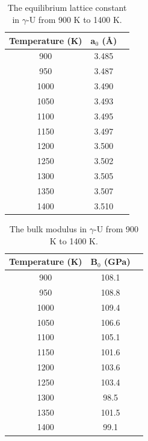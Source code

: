 \documentclass[review]{elsarticle}
\begin{document}
\begin{appendices}

\section{}

\setcounter{table}{0}
\renewcommand{\thetable}{A\arabic{table}}

\begin{table}[h]
\caption{The equilibrium lattice constant in $\gamma$-U from 900 K to 1400 K.} \label{tab:alat}
\begin{center}
\begin{tabular}{|c|c|c|}
	\hline
	Temperature (K) & a$_{0}$ ({\AA}) \\
	 \hline
900	&	3.485 \\
950	&	3.487 \\
1000	 &	3.490 \\
1050	 &	3.493 \\
1100	 &	3.495 \\
1150	 &	3.497 \\
1200	 &	3.500 \\
1250	 &	3.502 \\
1300	 &	3.505 \\
1350	 &	3.507 \\
1400	 &	3.510 \\
	 \hline
\end{tabular}
\end{center}
\label{default}
\end{table}

\begin{table}[h]
\caption{The bulk modulus in $\gamma$-U from 900 K to 1400 K.} \label{tab:bulk}
\begin{center}
\begin{tabular}{|c|c|c|}
	\hline
	Temperature (K) & B$_{0}$ (GPa) \\
	 \hline
900	&	108.1 \\
950	&	108.8 \\
1000	 &	109.4 \\
1050	 &	106.6 \\
1100	 &	105.1 \\
1150	 &	101.6 \\
1200	 &	103.6 \\
1250	 &	103.4 \\
1300	 &	98.5 \\
1350	 &	101.5 \\
1400	 &	99.1 \\
	 \hline
\end{tabular}
\end{center}
\label{default}
\end{table}



\end{appendices}
\end{document}
